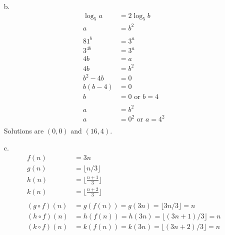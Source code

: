 \documentclass{article}
\begin{document}
\begin{enumerate}
    \item[b. ]  \[\begin{aligned}
                  \log_5 a & = 2 \log_5 b              \\
                  a        & = b^2                     \\
                  \\
                  81^b     & = 3^a                     \\
                  3^{4b}   & = 3^a                     \\
                  4b       & = a                       \\
                  4b       & = b^2                     \\
                  b^2 - 4b & = 0                       \\
                  b(b-4)   & = 0                       \\
                  b        & = 0 \text{ or } b = 4     \\
                  \\
                  a        & = b^2                     \\
                  a        & = 0^2 \text{ or } a = 4^2 \\
              \end{aligned}\]
          Solutions are $(0,0)$ and $(16,4)$.
    \item[c.] \[\begin{aligned}
                  f(n)          & = 3n                                             \\
                  g(n)          & = \lfloor{n/3}\rfloor                            \\
                  h(n)          & = \lfloor{\frac{n+1}{3}}\rfloor                  \\
                  k(n)          & = \lfloor{\frac{n+2}{3}}\rfloor                  \\
                  \\
                  (g\circ f)(n) & = g(f(n)) = g(3n) = \lfloor{3n/3}\rfloor = n     \\
                  (h\circ f)(n) & = h(f(n)) = h(3n) = \lfloor{(3n+1)/3}\rfloor = n \\
                  (k\circ f)(n) & = k(f(n)) = k(3n) = \lfloor{(3n+2)/3}\rfloor = n \\
              \end{aligned}\]
\end{enumerate}
\end{document}
